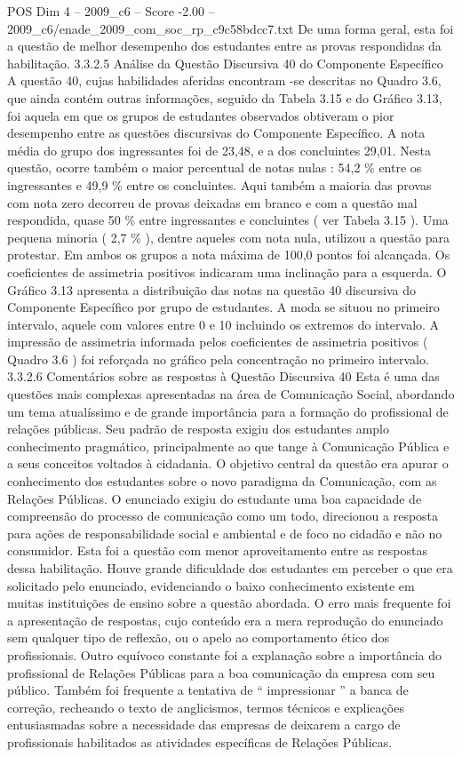 \begin{textsample}{POS Dim 4 – 2009\_c6 – Score -2.00 – 2009\_c6/enade\_2009\_com\_soc\_rp\_c9c58bdcc7.txt}
De uma forma geral, esta foi a questão de melhor desempenho dos estudantes entre as provas respondidas da habilitação. 3.3.2.5 Análise da Questão Discursiva 40 do Componente Específico A questão 40, cujas habilidades aferidas encontram -se descritas no Quadro 3.6, que ainda contém outras informações, seguido da Tabela 3.15 e do Gráfico 3.13, foi aquela em que os grupos de estudantes observados obtiveram o pior desempenho entre as questões discursivas do Componente Específico.
A nota média do grupo dos ingressantes foi de 23,48, e a dos concluintes 29,01.
Nesta questão, ocorre também o maior percentual de notas nulas : 54,2 \% entre os ingressantes e 49,9 \% entre os concluintes.
Aqui também a maioria das provas com nota zero decorreu de provas deixadas em branco e com a questão mal respondida, quase 50 \% entre ingressantes e concluintes ( ver Tabela 3.15 ).
Uma pequena minoria ( 2,7 \% ), dentre aqueles com nota nula, utilizou a questão para protestar.
Em ambos os grupos a nota máxima de 100,0 pontos foi alcançada.
Os coeficientes de assimetria positivos indicaram uma inclinação para a esquerda.
O Gráfico 3.13 apresenta a distribuição das notas na questão 40 discursiva do Componente Específico por grupo de estudantes.
A moda se situou no primeiro intervalo, aquele com valores entre 0 e 10 incluindo os extremos do intervalo.
A impressão de assimetria informada pelos coeficientes de assimetria positivos ( Quadro 3.6 ) foi reforçada no gráfico pela concentração no primeiro intervalo. 3.3.2.6 Comentários sobre as respostas à Questão Discursiva 40 Esta é uma das questões mais complexas apresentadas na área de Comunicação Social, abordando um tema atualíssimo e de grande importância para a formação do profissional de relações públicas.
Seu padrão de resposta exigiu dos estudantes amplo conhecimento pragmático, principalmente ao que tange à Comunicação Pública e a seus conceitos voltados à cidadania.
O objetivo central da questão era apurar o conhecimento dos estudantes sobre o novo paradigma da Comunicação, com as Relações Públicas.
O enunciado exigiu do estudante uma boa capacidade de compreensão do processo de comunicação como um todo, direcionou a resposta para ações de responsabilidade social e ambiental e de foco no cidadão e não no consumidor.
Esta foi a questão com menor aproveitamento entre as respostas dessa habilitação.
Houve grande dificuldade dos estudantes em perceber o que era solicitado pelo enunciado, evidenciando o baixo conhecimento existente em muitas instituições de ensino sobre a questão abordada.
O erro mais frequente foi a apresentação de respostas, cujo conteúdo era a mera reprodução do enunciado sem qualquer tipo de reflexão, ou o apelo ao comportamento ético dos profissionais.
Outro equívoco constante foi a explanação sobre a importância do profissional de Relações Públicas para a boa comunicação da empresa com seu público.
Também foi frequente a tentativa de “ impressionar ” a banca de correção, recheando o texto de anglicismos, termos técnicos e explicações entusiasmadas sobre a necessidade das empresas de deixarem a cargo de profissionais habilitados as atividades específicas de Relações Públicas.

\end{textsample}
